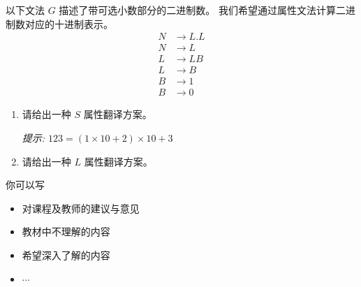 \documentclass[a4paper, justified]{tufte-handout}
\begin{document}
\begin{problem}[\score{10 = 5 + 5}]
  以下文法 $G$ 描述了带可选小数部分的二进制数。
  我们希望通过属性文法计算二进制数对应的十进制表示。
  \begin{align*}
    N &\to L . L \\
    N &\to L \\
    L &\to LB \\
    L &\to B \\
    B &\to 1 \\
    B &\to 0
  \end{align*}

  \begin{enumerate}[(1)]
    \item 请给出一种 $S$ 属性翻译方案。

      {\it 提示: $123 = (1 \times 10 + 2) \times 10 + 3$}
    \item 请给出一种 $L$ 属性翻译方案。
  \end{enumerate}
\end{problem}

\begin{solution}
\end{solution}



\beginfb

你可以写
\begin{itemize}
  \item 对课程及教师的建议与意见
  \item 教材中不理解的内容
  \item 希望深入了解的内容
  \item $\cdots$
\end{itemize}
\end{document}
